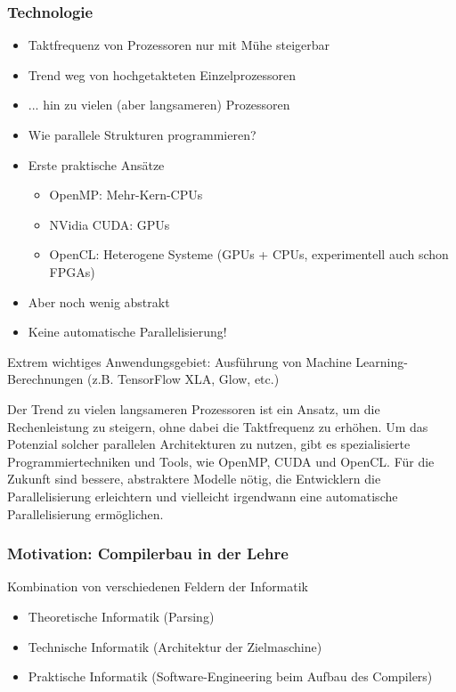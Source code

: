 \subsubsection*{Technologie}
\begin{itemize}
	\item Taktfrequenz von Prozessoren nur mit Mühe steigerbar
	\item Trend weg von hochgetakteten Einzelprozessoren
	\item ... hin zu vielen (aber langsameren) Prozessoren
	\item Wie parallele Strukturen programmieren?
	\item Erste praktische Ansätze
	\begin{itemize}
		\item OpenMP: Mehr-Kern-CPUs
		\item NVidia CUDA: GPUs
		\item OpenCL: Heterogene Systeme (GPUs + CPUs, experimentell auch schon FPGAs)
	\end{itemize}
	\item Aber noch wenig abstrakt 
	\item Keine automatische Parallelisierung!
\end{itemize}
Extrem wichtiges Anwendungsgebiet: Ausführung von Machine Learning-Berechnungen (z.B. TensorFlow XLA, Glow, etc.)
\begin{infoBox}
    Der Trend zu vielen langsameren Prozessoren ist ein Ansatz, um die Rechenleistung zu steigern, ohne dabei die Taktfrequenz zu erhöhen. Um das Potenzial solcher parallelen Architekturen zu nutzen, gibt es spezialisierte Programmiertechniken und Tools, wie OpenMP, CUDA und OpenCL. Für die Zukunft sind bessere, abstraktere Modelle nötig, die Entwicklern die Parallelisierung erleichtern und vielleicht irgendwann eine automatische Parallelisierung ermöglichen.
\end{infoBox}
\subsubsection*{Motivation: Compilerbau in der Lehre}
Kombination von verschiedenen Feldern der Informatik
\begin{itemize}
	\item Theoretische Informatik (Parsing)
	\item Technische Informatik (Architektur der Zielmaschine)
	\item Praktische Informatik (Software-Engineering beim Aufbau des Compilers)
\end{itemize}

